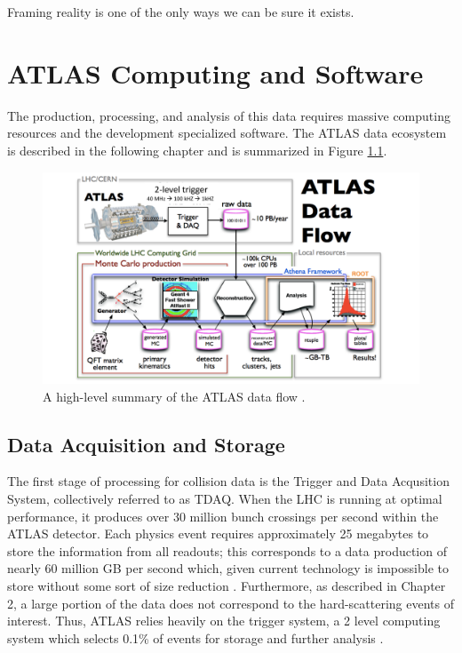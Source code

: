 \begin{savequote}[75mm]
Framing reality is one of the only ways we can be sure it exists.
\end{savequote}

\chapter{ATLAS Computing and Software}

 The production, processing, and analysis of this data requires massive computing resources and the development specialized software. The ATLAS data ecosystem is described in the following chapter and is summarized in Figure \ref{fig:data_flow}.

\begin{figure}[h]
    \centering
    \includegraphics[width=5in]{figures/chapter3/atlas-data-flow.pdf}
    \caption{A high-level summary of the ATLAS data flow \cite{data_flow}.}
    \label{fig:data_flow}
\end{figure}

\section{Data Acquisition and Storage}
The first stage of processing for collision data is the Trigger and Data Acqusition System, collectively referred to as TDAQ. When the LHC is running at optimal performance, it produces over 30 million bunch crossings per second within the ATLAS detector. Each physics event requires approximately 25 megabytes to store the information from all readouts; this corresponds to a data production of nearly 60 million GB per second which, given current technology is impossible to store without some sort of size reduction \cite{trig_web}. Furthermore, as described in Chapter 2, a large portion of the data does not correspond to the hard-scattering events of interest. Thus, ATLAS relies heavily on the trigger system, a 2 level computing system which selects 0.1\% of events for storage and further analysis \cite{trig_2015}.\\

